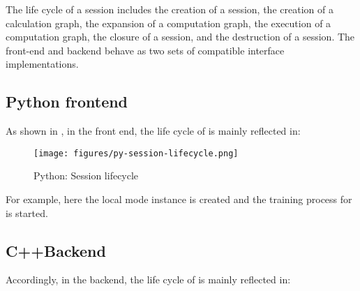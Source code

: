 \begin{content}

The life cycle of a session includes the creation of a session, the creation of a calculation graph, the expansion of a computation graph, the execution of a computation graph, the closure of a session, and the destruction of a session. The front-end  and backend\cpp{} behave as two sets of compatible interface implementations.

\subsection{Python frontend}

As shown in , in the  front end, the life cycle of  is mainly reflected in:

\begin{enum}
    \begin{enum}
    \end{enum}
\end{enum}

\begin{figure}[H]
\centering
\texttt{[image: figures/py-session-lifecycle.png]}
\caption{Python: Session lifecycle}
 \label{fig:py-session-lifecycle}
\end{figure}

For example, here the local mode  instance is created and the training process for  is started.


\subsection{C++Backend}

Accordingly, in the \cpp{} backend, the life cycle of  is mainly reflected in:


\end{content}
